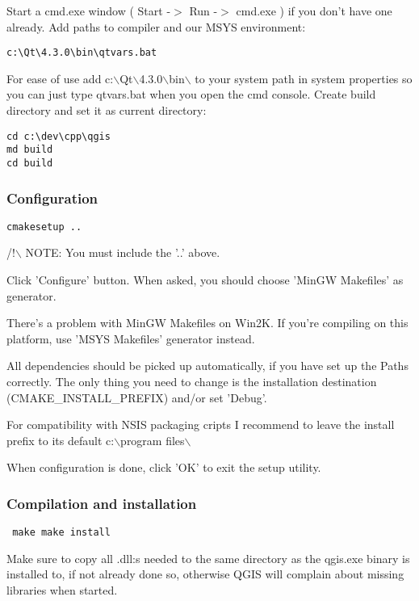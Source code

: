 Start a cmd.exe window ( Start -$>$ Run -$>$ cmd.exe ) if you don't have one
already.  Add paths to compiler and our MSYS environment:

\begin{verbatim}
c:\Qt\4.3.0\bin\qtvars.bat 
\end{verbatim}

For ease of use add c:$\backslash$Qt$\backslash$4.3.0$\backslash$bin$\backslash$ to your system path in system
properties so you can just type qtvars.bat when you open the cmd console.
Create build directory and set it as current directory:

\begin{verbatim}
cd c:\dev\cpp\qgis 
md build 
cd build 
\end{verbatim}

\subsubsection{Configuration}
\begin{verbatim}
cmakesetup ..  
\end{verbatim}

/!$\backslash$ NOTE: You must include the '..' above.

Click 'Configure' button.  When asked, you should choose 'MinGW Makefiles'
as generator.

There's a problem with MinGW Makefiles on Win2K. If you're compiling on this
platform, use 'MSYS Makefiles' generator instead.

All dependencies should be picked up automatically, if you have set up the
Paths correctly. The only thing you need to change is the installation
destination (CMAKE\_INSTALL\_PREFIX) and/or set 'Debug'.

For compatibility with NSIS packaging cripts I recommend to leave the
install prefix to its default c:$\backslash$program files$\backslash$

When configuration is done, click 'OK' to exit the setup utility.

\subsubsection{Compilation and installation}
\begin{verbatim}
 make make install 
\end{verbatim}

Make sure to copy all .dll:s needed to the same directory as the qgis.exe
binary is installed to, if not already done so, otherwise QGIS will complain
about missing libraries when started.

